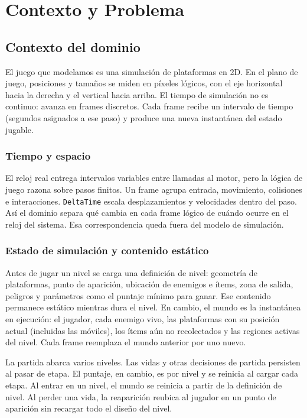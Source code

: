 \section{Contexto y Problema}
\label{sec:contexto-problema}

\subsection{Contexto del dominio}
\label{subsec:contexto-dominio}

El juego que modelamos es una simulación de plataformas en 2D. En el plano de juego,
posiciones y tamaños se miden en píxeles lógicos, con el eje horizontal hacia la derecha
y el vertical hacia arriba. El tiempo de simulación no es continuo: avanza en frames
discretos. Cada frame recibe un intervalo de tiempo (segundos asignados a ese paso) y
produce una nueva instantánea del estado jugable.

\subsubsection{Tiempo y espacio}
\label{subsubsec:dominio-tiempo-espacio}

El reloj real entrega intervalos variables entre llamadas al motor, pero la lógica de juego
razona sobre pasos finitos. Un frame agrupa entrada, movimiento, colisiones e
interacciones. \texttt{DeltaTime} escala desplazamientos y velocidades dentro del paso.
Así el dominio separa qué cambia en cada frame lógico de cuándo ocurre en el reloj del
sistema. Esa correspondencia queda fuera del modelo de simulación.

\subsubsection{Estado de simulación y contenido estático}
\label{subsubsec:dominio-estado-estatico}

Antes de jugar un nivel se carga una definición de nivel: geometría de plataformas,
punto de aparición, ubicación de enemigos e ítems, zona de salida, peligros y
parámetros como el puntaje mínimo para ganar. Ese contenido permanece estático mientras
dura el nivel. En cambio, el mundo es la instantánea en ejecución: el jugador,
cada enemigo vivo, las plataformas con su posición actual (incluidas las móviles), los
ítems aún no recolectados y las regiones activas del nivel. Cada frame reemplaza el
mundo anterior por uno nuevo.

La partida abarca varios niveles. Las vidas y otras decisiones de partida persisten al
pasar de etapa. El puntaje, en cambio, es por nivel y se reinicia al cargar cada etapa.
Al entrar en un nivel, el mundo se reinicia a partir de la definición de nivel. Al perder
una vida, la reaparición reubica al jugador en un punto de aparición sin recargar todo el
diseño del nivel.


